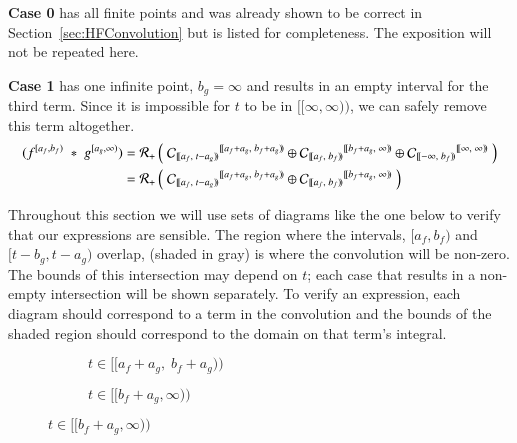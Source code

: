 \textbf{Case 0} has all finite points and was already shown to be correct in Section~\ref{sec:HFConvolution} but is listed
for completeness.
The exposition will not be repeated here.


\textbf{Case 1} has one infinite point, $b_g = \infty$ and results in an empty interval for the third term.
Since it is impossible for $t$ to be in $[\![\infty, \infty )\!)$, we can safely remove this term altogether.
\begin{align*}
	(f^{[a_f,b_f)} \;*\; g^{[a_g,\infty)})
	= \R[+] &\left( \;
			{\C[ [\![a_f,\;t-a_g)\!) ]}^{[\![a_f+a_g,\; b_f+a_g)\!)} \oplus
			{\C[ [\![a_f,\;b_f)\!) ]}^{[\![b_f+a_g,\; \infty)\!)} \oplus
			{\C[ [\![-\infty,\;b_f)\!) ]}^{[\![\infty,\; \infty)\!)} 
		\; \right)\\
	= \R[+] &\left( \;
			{\C[ [\![a_f,\;t-a_g)\!) ]}^{[\![a_f+a_g,\; b_f+a_g)\!)} \oplus
			{\C[ [\![a_f,\;b_f)\!) ]}^{[\![b_f+a_g,\; \infty)\!)}
		\; \right)
\end{align*}


Throughout this section we will use sets of diagrams like the one below to verify that our expressions are sensible.
The region where the intervals, $[a_f, b_f)$ and $[t-b_g, t-a_g)$ overlap, (shaded in gray) is where the convolution 
will be non-zero.
The bounds of this intersection may depend on $t$; each case that results in a non-empty intersection will be
shown separately.
To verify an expression, each diagram should correspond to a term in the convolution and the bounds of the shaded 
region should correspond to the domain on that term's integral.
\begin{figure}[h]
	\centering
	\begin{subfigure}[h]{0.4\textwidth}
		\caption{$t \in [\![a_f+a_g, \; b_f+a_g)\!)$} 
		\centering
	\end{subfigure}
	\begin{subfigure}[h]{0.4\textwidth}
		\caption{$t \in [\![b_f+a_g, \infty)\!)$} 
		\centering
	\end{subfigure}
\end{figure}


